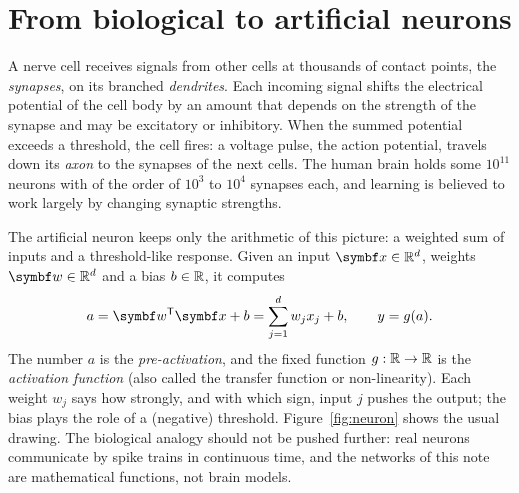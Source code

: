 \documentclass[11pt]{article}
\newcommand{\w}{\vect{w}}
\begin{document}

\section{From biological to artificial neurons}\label{sec:neuron}

A nerve cell receives signals from other cells at thousands of contact points, the \emph{synapses}, on its branched
\emph{dendrites}. Each incoming signal shifts the electrical potential of the cell body by an amount that depends on
the strength of the synapse and may be excitatory or inhibitory. When the summed potential exceeds a threshold, the cell
fires: a voltage pulse, the action potential, travels down its \emph{axon} to the synapses of the next cells. The
human brain holds some $10^{11}$ neurons with of the order of $10^3$ to $10^4$ synapses each, and learning is believed
to work largely by changing synaptic strengths.

The artificial neuron keeps only the arithmetic of this picture: a weighted sum of inputs and a threshold-like
response. Given an input $\x \in \R^d$, weights $\w \in \R^d$ and a bias $b \in \mathbb{R}$, it computes
\begin{equation}\label{eq:neuron}
  a = \w\T\x + b = \sum_{j=1}^d w_jx_j + b, \qquad y = g(a) .
\end{equation}
The number $a$ is the \emph{pre-activation}, and the fixed function $g : \mathbb{R} \to \mathbb{R}$ is the \emph{activation function}
(also called the transfer function or non-linearity). Each weight $w_j$ says how strongly, and with which sign, input
$j$ pushes the output; the bias plays the role of a (negative) threshold. Figure~\ref{fig:neuron} shows the usual
drawing. The biological analogy should not be pushed further: real neurons communicate by spike trains in continuous
time, and the networks of this note are mathematical functions, not brain models.
\end{document}
